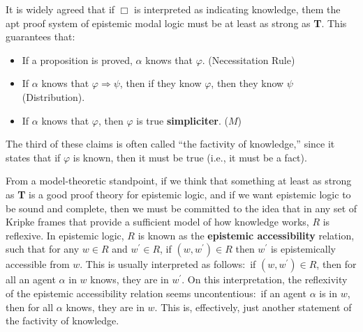 \documentclass[11pt]{article}
\theoremstyle{definition}
\theoremstyle{remark}
\begin{document}
It is widely agreed that if $\Box$ is interpreted as indicating knowledge, them the apt proof system of epistemic modal logic must be at least as strong as \textbf{T}. This guarantees that:
\begin{itemize}
    \item If a proposition is proved, $\alpha$ knows that $\varphi$. (Necessitation Rule)

    \item If $\alpha$ knows that $\varphi\Rightarrow\psi$, then if they know $\varphi$, then they know $\psi$ (Distribution).

    \item If $\alpha$ knows that $\varphi$, then $\varphi$ is true \textbf{simpliciter}. ($M$)
\end{itemize}
The third of these claims is often called ``the factivity of knowledge,'' since it states that if $\varphi$ is known, then it must be true (i.e., it must be a fact).\par 


From a model-theoretic standpoint, if we think that something at least as strong as \textbf{T} is a good proof theory for epistemic logic, and if we want epistemic logic to be sound and complete, then we must be committed to the idea that in any set of Kripke frames that provide a sufficient model of how knowledge works, $R$ is reflexive. In epistemic logic, $R$ is known as the \textbf{epistemic accessibility} relation, such that for any $w\in R$ and $w^{\prime}\in R$, if $(w,w^{\prime})\in R$ then $w^{\prime}$ is epistemically accessible from $w$. This is usually interpreted as follows:\ if $(w,w^{\prime})\in R$, then for all an agent $\alpha$ in $w$ knows, they are in $w^{\prime}$. On this interpretation, the reflexivity of the epistemic accessibility relation seems uncontentious:\ if an agent $\alpha$ is in $w$, then for all $\alpha$ knows, they are in $w$. This is, effectively, just another statement of the factivity of knowledge.\par 
\end{document}
